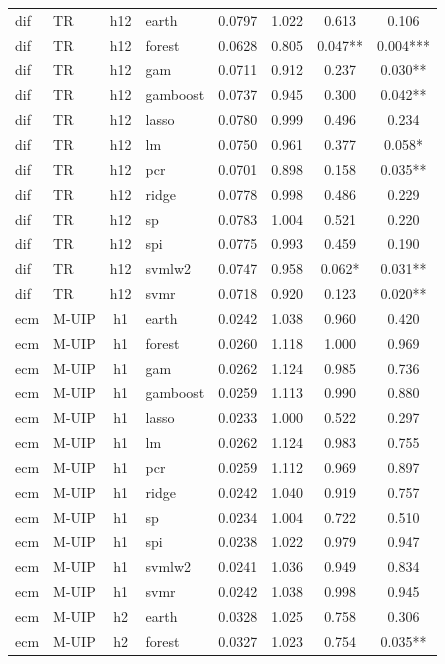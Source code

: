 \begin{ThreePartTable}
\begin{longtable}[t]{llclcccc}
dif & TR & h12 & earth & 0.0797 & 1.022 & 0.613 & 0.106\\
dif & TR & h12 & forest & 0.0628 & 0.805 & 0.047** & 0.004***\\
dif & TR & h12 & gam & 0.0711 & 0.912 & 0.237 & 0.030**\\
dif & TR & h12 & gamboost & 0.0737 & 0.945 & 0.300 & 0.042**\\
dif & TR & h12 & lasso & 0.0780 & 0.999 & 0.496 & 0.234\\
dif & TR & h12 & lm & 0.0750 & 0.961 & 0.377 & 0.058*\\
dif & TR & h12 & pcr & 0.0701 & 0.898 & 0.158 & 0.035**\\
dif & TR & h12 & ridge & 0.0778 & 0.998 & 0.486 & 0.229\\
dif & TR & h12 & sp & 0.0783 & 1.004 & 0.521 & 0.220\\
dif & TR & h12 & spi & 0.0775 & 0.993 & 0.459 & 0.190\\
dif & TR & h12 & svmlw2 & 0.0747 & 0.958 & 0.062* & 0.031**\\
dif & TR & h12 & svmr & 0.0718 & 0.920 & 0.123 & 0.020**\\
\addlinespace
ecm & M-UIP & h1 & earth & 0.0242 & 1.038 & 0.960 & 0.420\\
ecm & M-UIP & h1 & forest & 0.0260 & 1.118 & 1.000 & 0.969\\
ecm & M-UIP & h1 & gam & 0.0262 & 1.124 & 0.985 & 0.736\\
ecm & M-UIP & h1 & gamboost & 0.0259 & 1.113 & 0.990 & 0.880\\
ecm & M-UIP & h1 & lasso & 0.0233 & 1.000 & 0.522 & 0.297\\
ecm & M-UIP & h1 & lm & 0.0262 & 1.124 & 0.983 & 0.755\\
ecm & M-UIP & h1 & pcr & 0.0259 & 1.112 & 0.969 & 0.897\\
ecm & M-UIP & h1 & ridge & 0.0242 & 1.040 & 0.919 & 0.757\\
ecm & M-UIP & h1 & sp & 0.0234 & 1.004 & 0.722 & 0.510\\
ecm & M-UIP & h1 & spi & 0.0238 & 1.022 & 0.979 & 0.947\\
ecm & M-UIP & h1 & svmlw2 & 0.0241 & 1.036 & 0.949 & 0.834\\
ecm & M-UIP & h1 & svmr & 0.0242 & 1.038 & 0.998 & 0.945\\
\addlinespace
ecm & M-UIP & h2 & earth & 0.0328 & 1.025 & 0.758 & 0.306\\
ecm & M-UIP & h2 & forest & 0.0327 & 1.023 & 0.754 & 0.035**\\

\end{longtable}
\end{ThreePartTable}
